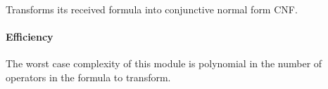 Transforms its received formula into conjunctive normal form CNF.

\paragraph{Efficiency} The worst case complexity of this module is polynomial in the number of operators in the formula to transform.
